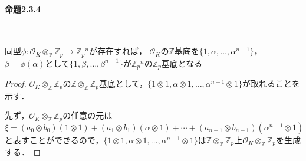 \paragraph{命題2.3.4}~
\begin{screen}
  同型$\phi\colon\mathcal{O}_K\otimes_\mathbb{Z}\mathbb{Z}_p\to\mathbb{Z}_p{}^n$が存在すれば，
  $\mathcal{O}_K$の$\mathbb{Z}$基底を$\{1, \alpha, \ldots, \alpha^{n-1}\}$，
  $\beta=\phi(\alpha)$として$\{1, \beta, \ldots, \beta^{n-1}\}$が$\mathbb{Z}_p{}^n$の$\mathbb{Z}_p$基底となる
\end{screen}
\begin{proof}
  $\mathcal{O}_K \otimes_\mathbb{Z} \mathbb{Z}_p$の$\mathbb{Z} \otimes_\mathbb{Z} \mathbb{Z}_p$基底として，$\{1 \otimes 1, \alpha \otimes 1, \ldots, \alpha^{n-1} \otimes 1\}$が取れることを示す．

  先ず，$\mathcal{O}_K \otimes_\mathbb{Z} \mathbb{Z}_p$の任意の元は
  \[\xi = (a_0 \otimes b_0)(1 \otimes 1) + (a_1\otimes b_1)(\alpha \otimes 1) + \cdots + (a_{n-1} \otimes b_{n-1})(\alpha^{n-1} \otimes 1)\]
  と表すことができるので，$\{1 \otimes 1, \alpha \otimes 1, \ldots, \alpha^{n-1} \otimes 1\}$は$\mathbb{Z} \otimes_\mathbb{Z} \mathbb{Z}_p$上$\mathcal{O}_K \otimes_\mathbb{Z} \mathbb{Z}_p$を生成する．


\end{proof}
